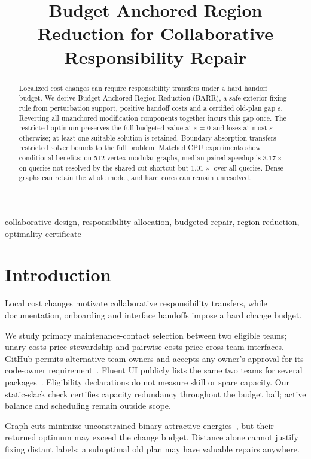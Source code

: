 \documentclass[conference]{IEEEtran}
\title{Budget Anchored Region Reduction for Collaborative Responsibility Repair}
\author{\IEEEauthorblockN{Zhiran Wang}\IEEEauthorblockA{Ocean University of China\\2174560006@qq.com}}
\newcommand{\eps}{\varepsilon}
\begin{document}
\maketitle
\begin{abstract}
Localized cost changes can require responsibility transfers under a hard handoff budget. We derive Budget Anchored Region Reduction (BARR), a safe exterior-fixing rule from perturbation support, positive handoff costs and a certified old-plan gap $\eps$. Reverting all unanchored modification components together incurs this gap once. The restricted optimum preserves the full budgeted value at $\eps=0$ and loses at most $\eps$ otherwise; at least one suitable solution is retained. Boundary absorption transfers restricted solver bounds to the full problem. Matched CPU experiments show conditional benefits: on 512-vertex modular graphs, median paired speedup is $3.17\times$ on queries not resolved by the shared cut shortcut but $1.01\times$ over all queries. Dense graphs can retain the whole model, and hard cores can remain unresolved.
\end{abstract}
\begin{IEEEkeywords}
collaborative design, responsibility allocation, budgeted repair, region reduction, optimality certificate
\end{IEEEkeywords}

\section{Introduction}
Local cost changes motivate collaborative responsibility transfers, while documentation, onboarding and interface handoffs impose a hard change budget.

We study primary maintenance-contact selection between two eligible teams; unary costs price stewardship and pairwise costs price cross-team interfaces. GitHub permits alternative team owners and accepts any owner's approval for its code-owner requirement~\cite{githubowners}. Fluent UI publicly lists the same two teams for several packages~\cite{fluentuiowners}. Eligibility declarations do not measure skill or spare capacity. Our static-slack check certifies capacity redundancy throughout the budget ball; active balance and scheduling remain outside scope.

Graph cuts minimize unconstrained binary attractive energies~\cite{kolmogorov2004graphcuts}, but their returned optimum may exceed the change budget. Distance alone cannot justify fixing distant labels: a suboptimal old plan may have valuable repairs anywhere.
\end{document}
